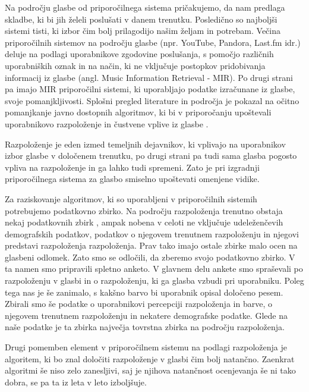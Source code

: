 \documentclass[a4paper, 12pt]{book}
\begin{document}
{Na področju glasbe od priporočilnega sistema pričakujemo, da nam predlaga skladbe, ki bi jih želeli poslušati v danem trenutku. Posledično so najboljši sistemi tisti, ki izbor čim bolj prilagodijo našim željam in potrebam. Večina priporočilnih sistemov na področju glasbe (npr. YouTube, Pandora, Last.fm idr.) deluje na podlagi uporabnikove zgodovine poslušanja, s pomočjo različnih uporabniških oznak in na način, ki ne vključuje postopkov pridobivanja informacij iz glasbe (angl. Music Information Retrieval - MIR). Po drugi strani pa imajo MIR priporočilni sistemi, ki uporabljajo podatke izračunane iz glasbe, svoje pomanjkljivosti. Splošni pregled literature in področja je pokazal na očitno pomanjkanje javno dostopnih algoritmov, ki bi v priporočanju upoštevali uporabnikovo razpoloženje in čustvene vplive iz glasbe \cite{JaeSikLee2006, Song2012, chen2001music}.  

Razpoloženje je eden izmed temeljnih dejavnikov, ki vplivajo na uporabnikov izbor glasbe v določenem trenutku, po drugi strani pa tudi sama glasba pogosto vpliva na razpoloženje in ga lahko tudi spremeni. Zato je pri izgradnji priporočilnega sistema za glasbo smiselno upoštevati omenjene vidike.

Za raziskovanje algoritmov, ki so uporabljeni v priporočilnih sistemih potrebujemo podatkovno zbirko. Na področju razpoloženja trenutno obstaja nekaj podatkovnih zbirk \cite{Eerola2010, schmidt2011modeling, turnbull2008semantic, schuller2010mister, panda2013multi}, ampak nobena v celoti ne vključuje udeleženčevih demografskih podatkov, podatkov o njegovem trenutnem razpoloženju in njegovi predstavi razpoloženja razpoloženja. Prav tako imajo ostale zbirke malo ocen na glasbeni odlomek. Zato smo se odločili, da zberemo svojo podatkovno zbirko. V ta namen smo pripravili spletno anketo. V glavnem delu ankete smo spraševali po razpoloženju v glasbi in o razpoloženju, ki ga glasba vzbudi pri uporabniku. Poleg tega nas je še zanimalo, s kakšno barvo bi uporabnik opisal določeno pesem. Zbirali smo še podatke o uporabnikovi percepciji razpoloženja in barve, o njegovem trenutnem razpoloženju in nekatere demografske podatke. Glede na naše podatke je ta zbirka največja tovrstna zbirka na področju razpoloženja. 

Drugi pomemben element v priporočilnem sistemu na podlagi razpoloženja je algoritem, ki bo znal določiti razpoloženje v glasbi čim bolj natančno. Zaenkrat algoritmi še niso zelo zanesljivi, saj je njihova natančnost ocenjevanja še ni tako dobra, se pa ta iz leta v leto izboljšuje. 

}
\end{document}
